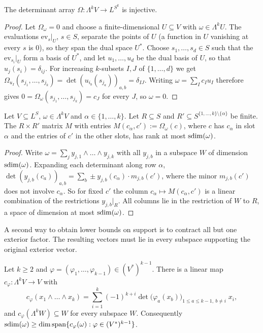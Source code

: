 \begin{lemma}\label{lem:detinj}
The determinant array $\Omega\colon\Lambda^kV\to L^{S^k}$ is injective.
\end{lemma}

\begin{proof}
Let $\Omega_\omega=0$ and choose a finite-dimensional $U\subseteq V$ with $\omega\in\Lambda^kU$. The evaluations
$\mathrm{ev}_s|_U$, $s\in S$, separate the points of $U$ (a function in $U$ vanishing at every $s$ is $0$), so they span
the dual space $U^*$. Choose $s_1,\dots,s_d\in S$ such that the $\mathrm{ev}_{s_i}|_U$ form a basis of $U^*$, and let
$u_1,\dots,u_d$ be the dual basis of $U$, so that $u_j(s_i)=\delta_{ij}$. For increasing $k$\nobreakdash-subsets $I,J$ of
$\{1,\dots,d\}$ we get $\Omega_{u_I}(s_{j_1},\dots,s_{j_k})=\det(u_{i_b}(s_{j_a}))_{a,b}=\delta_{IJ}$. Writing
$\omega=\sum_Ic_Iu_I$ therefore gives $0=\Omega_\omega(s_{j_1},\dots,s_{j_k})=c_J$ for every $J$, so $\omega=0$.
\end{proof}

\begin{lemma}\label{lem:flat}
Let $V\subseteq L^S$, $\omega\in\Lambda^kV$ and $\alpha\in\{1,\dots,k\}$. Let $R\subseteq S$ and
$R'\subseteq S^{\{1,\dots,k\}\setminus\{\alpha\}}$ be finite. The $R\times R'$ matrix $M$ with entries
$M(c_\alpha,c'):=\Omega_\omega(c)$, where $c$ has $c_\alpha$ in slot $\alpha$ and the entries of $c'$ in the other
slots, has rank at most $\operatorname{sdim}(\omega)$.
\end{lemma}

\begin{proof}
Write $\omega=\sum_jy_{j,1}\wedge\dots\wedge y_{j,k}$ with all $y_{j,b}$ in a subspace $W$ of dimension $\operatorname{sdim}(\omega)$.
Expanding each determinant along row $\alpha$,
$\det(y_{j,b}(c_a))_{a,b}=\sum_b\pm y_{j,b}(c_\alpha)\cdot m_{j,b}(c')$, where the minor $m_{j,b}(c')$ does not
involve $c_\alpha$. So for fixed $c'$ the column $c_\alpha\mapsto M(c_\alpha,c')$ is a linear combination of the
restrictions $y_{j,b}|_R$. All columns lie in the restriction of $W$ to $R$, a space of dimension at most
$\operatorname{sdim}(\omega)$.
\end{proof}

A second way to obtain lower bounds on support is to contract all but one exterior factor. The resulting vectors
must lie in every subspace supporting the original exterior vector.

\begin{samepage}
\begin{lemma}[contraction]\label{lem:contr}
Let $k\ge2$ and $\varphi=(\varphi_1,\dots,\varphi_{k-1})\in(V^*)^{k-1}$. There is a linear map $c_\varphi\colon\Lambda^kV\to V$
with
\[
c_\varphi(x_1\wedge\dots\wedge x_k)=\sum_{i=1}^k(-1)^{k+i}\det\bigl(\varphi_a(x_b)\bigr)_{1\le a\le k-1,\ b\ne i}\;x_i ,
\]
and $c_\varphi(\Lambda^kW)\subseteq W$ for every subspace $W$. Consequently
$\operatorname{sdim}(\omega)\ge\dim\operatorname{span}\{c_\varphi(\omega):\varphi\in(V^*)^{k-1}\}$.
\end{lemma}
\end{samepage}

